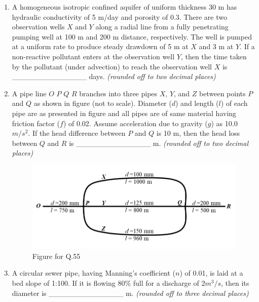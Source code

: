 \documentclass[journal]{IEEEtran}
\begin{document}
\begin{enumerate}[resume]
\item A homogeneous isotropic confined aquifer of uniform thickness 30 m has hydraulic conductivity of 5 m/day and porosity of 0.3. There are two observation wells $X$ and $Y$ along a radial line from a fully penetrating pumping well at 100 m and 200 m distance, respectively. The well is pumped at a uniform rate to produce steady drawdown of 5 m at $X$ and 3 m at $Y$. If a non-reactive pollutant enters at the observation well $Y$, then the time taken by the pollutant (under advection) to reach the observation well $X$ is \_\_\_\_\_\_\_\_\_\_\_\_\_\_ days. \textit{(rounded off to two decimal places)} \hfill{}

\item A pipe line $O$ $P$ $Q$ $R$ branches into three pipes $X$, $Y$, and $Z$ between points $P$ and $Q$ as shown in figure (not to scale). Diameter ($d$) and length ($l$) of each pipe are as presented in figure and all pipes are of same material having friction factor ($f$) of 0.02. Assume acceleration due to gravity ($g$) as 10.0 $m/s^2$. If the head difference between $P$ and $Q$ is 10 m, then the head loss between $Q$ and $R$ is \_\_\_\_\_\_\_\_\_\_\_\_\_\_ m. \textit{(rounded off to two decimal places)}
\hfill{}
\begin{figure}[H]
    \centering
    \includegraphics[width=0.8\columnwidth]{figs/fig17.png}
    \caption*{Figure for Q.55}
\end{figure}

\item A circular sewer pipe, having Manning's coefficient ($n$) of 0.01, is laid at a bed slope of 1:100. If it is flowing 80\% full for a discharge of $2 m^3/s$, then its diameter is \_\_\_\_\_\_\_\_\_\_\_\_\_\_ m. \textit{(rounded off to three decimal places)} \hfill{}


\end{enumerate}
\end{document}
